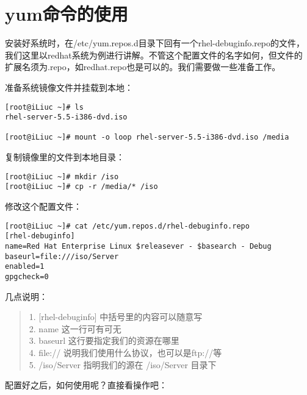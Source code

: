 \section{yum命令的使用}
\label{sec:yumCmd}
安装好系统时，在/etc/yum.repos.d目录下回有一个rhel-debuginfo.repo的文件，
我们这里以redhat系统为例进行讲解。不管这个配置文件的名字如何，但文件的
扩展名须为.repo，如redhat.repo也是可以的。我们需要做一些准备工作。

准备系统镜像文件并挂载到本地：

\small{
\begin{verbatim}
[root@iLiuc ~]# ls 
rhel-server-5.5-i386-dvd.iso

[root@iLiuc ~]# mount -o loop rhel-server-5.5-i386-dvd.iso /media
\end{verbatim}
}
\normalsize

复制镜像里的文件到本地目录：

\begin{verbatim}
[root@iLiuc ~]# mkdir /iso
[root@iLiuc ~]# cp -r /media/* /iso
\end{verbatim}

修改这个配置文件：

\begin{verbatim}
[root@iLiuc ~]# cat /etc/yum.repos.d/rhel-debuginfo.repo
[rhel-debuginfo]
name=Red Hat Enterprise Linux $releasever - $basearch - Debug
baseurl=file:///iso/Server
enabled=1
gpgcheck=0
\end{verbatim}

几点说明：

\begin{quote}
    1. [rhel-debuginfo] 中括号里的内容可以随意写 \\
    2. name 这一行可有可无 \\
    3. baseurl 这行要指定我们的资源在哪里 \\
    4. file:// 说明我们使用什么协议，也可以是ftp://等 \\
    5. /iso/Server 指明我们的源在 /iso/Server 目录下
\end{quote}

配置好之后，如何使用呢？直接看操作吧：

